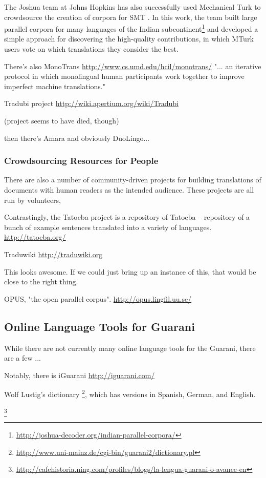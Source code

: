 The Joshua team at Johns Hopkins has also successfully used Mechanical Turk to
crowdsource the creation of corpora for SMT
\cite{post-callisonburch-osborne:2012:WMT}. In this work, the team built
large parallel corpora for many languages of the Indian
subcontinent\footnote{\url{http://joshua-decoder.org/indian-parallel-corpora/}}
and developed a simple approach for discovering the high-quality contributions,
in which MTurk users vote on which translations they consider the best.

There's also MonoTrans
\url{http://www.cs.umd.edu/hcil/monotrans/}
"... an iterative protocol in which monolingual human participants work
together to improve imperfect machine translations." 

Tradubi project
\url{http://wiki.apertium.org/wiki/Tradubi}

(project seems to have died, though)

then there's Amara and obviously DuoLingo...

\subsubsection{Crowdsourcing Resources for People}

There are also a number of community-driven projects for building translations
of documents with human readers as the intended audience. These projects are
all run by volunteers, 

Contrastingly, the Tatoeba project is a repository of 
Tatoeba -- repository of a bunch of example sentences translated into a variety
of languages.
\url{http://tatoeba.org/}


Traduwiki
\url{http://traduwiki.org}

This looks awesome. If we could just bring up an instance of this, that would
be close to the right thing.

OPUS, "the open parallel corpus".
\url{http://opus.lingfil.uu.se/}

\subsection{Online Language Tools for Guarani}

While there are not currently many online language tools for the Guarani, there
are a few ...

Notably, there is 
iGuarani
\url{http://iguarani.com/}

Wolf Lustig's dictionary
\footnote{\url{http://www.uni-mainz.de/cgi-bin/guarani2/dictionary.pl}}, which
has versions in Spanish, German, and English.


\footnote{\url{http://cafehistoria.ning.com/profiles/blogs/la-lengua-guarani-o-avanee-en}}
